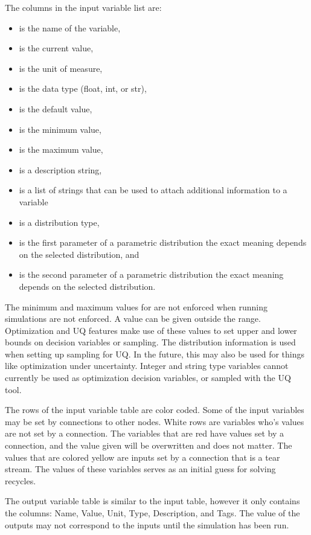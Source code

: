 The columns in the input variable list are:
\begin{itemize}
	\item {} is the name of the variable,
	\item {} is the current value,
	\item {} is the unit of measure,
	\item {} is the data type (float, int, or str),
	\item {} is the default value,
	\item {} is the minimum value,
	\item {} is the maximum value,
	\item {} is a description string,
	\item {} is a list of strings that can be used to attach additional information to a variable
	\item {} is a distribution type,
	\item {} is the first parameter of a parametric distribution the exact meaning depends on the selected distribution, and
	\item {} is the second parameter of a parametric distribution the exact meaning depends on the selected distribution.
\end{itemize}
The minimum and maximum values for are not enforced when running simulations are not enforced.  A value can be given outside the range. Optimization and UQ features make use of these values to set upper and lower bounds on decision variables or sampling. The distribution information is used when setting up sampling for UQ.  In the future, this may also be used for things like optimization under uncertainty.  Integer and string type variables cannot currently be used as optimization decision variables, or sampled with the UQ tool.

The rows of the input variable table are color coded.  Some of the input variables may be set by connections to other nodes.  White rows are variables who's values are not set by a connection.  The variables that are red have values set by a connection, and the value given will be overwritten and does not matter.  The values that are colored yellow are inputs set by a connection that is a tear stream.  The values of these variables serves as an initial guess for solving recycles.

The output variable table is similar to the input table, however it only contains the columns: Name, Value, Unit, Type, Description, and Tags.  The value of the outputs may not correspond to the inputs until the simulation has been run.


